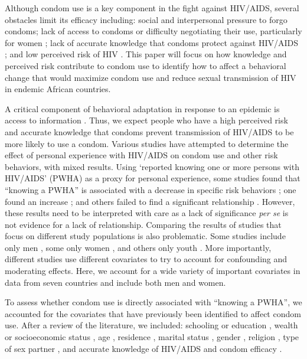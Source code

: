\documentclass[10pt,letterpaper]{article}
\begin{document}
Although condom use is a key component in the fight against HIV/AIDS, several obstacles limit its efficacy including: social and interpersonal pressure to forgo condoms; lack of access to condoms or difficulty negotiating their use, particularly for women \cite{ChimMcGr10, MacPTerr09, BassMhlo91, PettMeas04}; lack of accurate knowledge that condoms protect against HIV/AIDS \cite{KayiFors11}; and low perceived risk of HIV \cite{AdihAlex99, MeekSilv06}. This paper will focus on how knowledge and perceived risk contribute to condom use to identify how to affect a behavioral change that would maximize condom use and reduce sexual transmission of HIV in endemic African countries.


A critical component of behavioral adaptation in response to an epidemic is access to information \cite{Funk_2010, FunkGila09}. Thus, we expect people who have a high perceived risk and accurate knowledge that condoms prevent transmission of HIV/AIDS to be more likely to use a condom. Various studies have attempted to determine the effect of personal experience with HIV/AIDS on condom use and other risk behaviors, with mixed results. Using `reported knowing one or more persons with HIV/AIDS' (PWHA) as a proxy for personal experience, some studies found that ``knowing a PWHA'' is associated with a decrease in specific risk behaviors  \cite{GregZhuw98,IjumGami04, MaciBrow01}; one found an increase  \cite{PalePett08}; and others failed to find a significant relationship \cite{KayiFors11, CamlChim03, Zell03, Katz06}. However, these results need to be interpreted with care as a lack of significance \emph{per se} is not evidence for a lack of relationship. Comparing the results of studies that focus on different study populations is also problematic. Some studies include only men \cite{MaciBrow01}, some only women \cite{CamlChim03}, and others only youth \cite{ChimMcGr10, KayiFors11, Katz06, PalePett08}. More importantly, different studies use different covariates to try to account for confounding and moderating effects. Here, we account for a wide variety of important covariates in data from seven countries and include both men and women. 

To assess whether condom use is directly associated with ``knowing a PWHA'', we accounted for the covariates that have previously been identified to affect condom use. After a review of the literature, we included:
schooling or education \cite{MaciBrow01, CamlChim03, Katz06, OyedFeyi11, UchuMaga12},
wealth or socioeconomic status \cite{MeekSilv06, ChimMcGr10, OyedFeyi11},
age \cite{AdihAlex99, CamlChim03, Zell03, MeekSilv06, ChimMcGr10,  OyedFeyi11, UchuMaga12},
residence \cite{CamlChim03, OyedFeyi11, UchuMaga12},
marital status \cite{MaciBrow01, UchuMaga12},
gender \cite{MaciBrow01, ChimMcGr10},
religion \cite{MaciBrow01, OyedFeyi11, UchuMaga12},
type of sex partner \cite{CamlChim03, ChimMcGr10},
and accurate knowledge of HIV/AIDS and condom efficacy \cite{AdihAlex99, CamlChim03, Katz06,KayiFors11, LiddGile08}.
\end{document}
